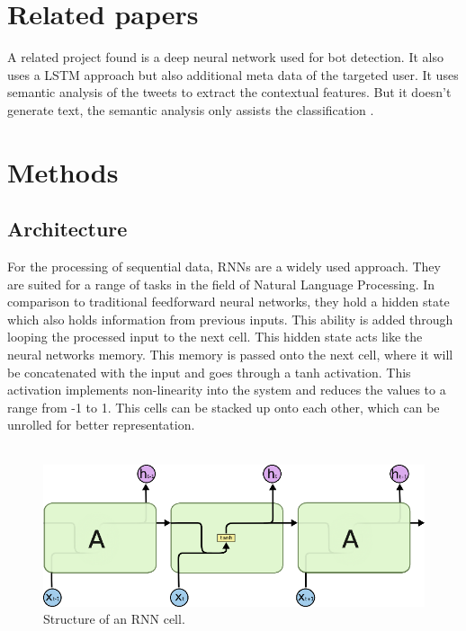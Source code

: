 \documentclass[conference]{IEEEtran}
\begin{document}
\section{Related papers}

A related project found is a deep neural network used for bot detection. It also uses a LSTM approach but also additional meta data of the targeted user. It uses semantic analysis of the tweets to extract the contextual features. But it doesn’t generate text, the semantic analysis only assists the classification \cite{tim2}.

\section{Methods}

\subsection{Architecture}

For the processing of sequential data, RNNs are a widely used approach. They are suited for a range of tasks in the field of Natural Language Processing. In comparison to traditional feedforward neural networks, they hold a hidden state which also holds information from previous inputs. This ability is added through looping the processed input to the next cell. This hidden state acts like the neural networks memory. This memory is passed onto the next cell, where it will be concatenated with the input and goes through a tanh activation. This activation implements non-linearity into the system and reduces the values to a range from -1 to 1. This cells can be stacked up onto each other, which can be unrolled for better representation.\\
\\

\begin{figure}[htbp]
\centerline{\includegraphics{pictures/structure_rnn.png}}
\caption{Structure of an RNN cell.}
\label{fig:structure_rnn}
\end{figure}
\end{document}
